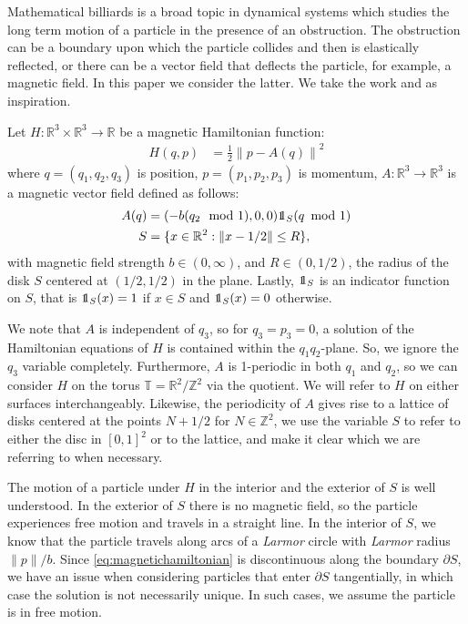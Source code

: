 
Mathematical billiards is a broad topic in dynamical systems which studies the long term motion of a particle in the presence of an obstruction. The obstruction can be a boundary upon which the particle collides and then is elastically reflected, or there can be a vector field that deflects the particle, for example, a magnetic field. In this paper we consider the latter. We take the work \cite{Knauf_2017} and \cite{Gasiorek_2021} as inspiration.

Let $H:\mathbb R^3\times\mathbb R^3\to\mathbb R$ be a magnetic Hamiltonian function:
\begin{align}\label{eq:magnetichamiltonian}
H(q,p) &= \frac{1}{2}\left\|p - A(q)\right\|^2
\end{align}
where $q=(q_1,q_2,q_3)$ is position, $p=(p_1,p_2,p_3)$ is momentum, $A:\mathbb R^3\to\mathbb R^3$ is a magnetic vector field defined as follows:
\begin{align}
A(q) &= (-b(q_2 \mod 1),0,0)\one_S(q\!\mod 1) \\
S &= \{x\in \mathbb R^2 : \|x-1/2\|\le R\},
\end{align}
with magnetic field strength $b\in(0,\infty)$, and $R\in(0,1/2)$, the radius of the disk $S$ centered at $(1/2,1/2)$ in the plane. Lastly, $\one_S$ is an indicator function on $S$, that is $\one_S(x)=1$ if $x\in S$ and $\one_S(x)=0$ otherwise.

We note that $A$ is independent of $q_3$, so for $q_3=p_3=0$, a solution of the Hamiltonian equations of $H$ is contained within the $q_1q_2$-plane. So, we ignore the $q_3$ variable completely. Furthermore, $A$ is 1-periodic in both $q_1$ and $q_2$, so we can consider $H$ on the torus $\mathbb T =\mathbb R^2/\mathbb Z^2$ via the quotient. We will refer to $H$ on either surfaces interchangeably. Likewise, the periodicity of $A$ gives rise to a lattice of disks centered at the points $N+1/2$ for $N\in\mathbb Z^2$, we use the variable $S$ to refer to either the disc in $[0,1]^2$ or to the lattice, and make it clear which we are referring to when necessary.

The motion of a particle under $H$ in the interior and the exterior of $S$ is well understood. In the exterior of $S$ there is no magnetic field, so the particle experiences free motion and travels in a straight line. In the interior of $S$, we know that the particle travels along arcs of a \textit{Larmor} circle with \textit{Larmor} radius $\|p\|/b$. Since \cref{eq:magnetichamiltonian} is discontinuous along the boundary $\partial S$, we have an issue when considering particles that enter $\partial S$ tangentially, in which case the solution is not necessarily unique. In such cases, we assume the particle is in free motion. 


